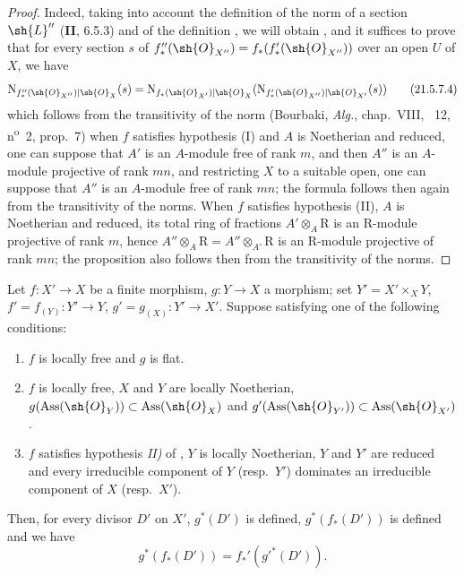 \begin{proof}
Indeed, taking into account the definition of the norm of a section $\sh{L}''$ (\textbf{II}, 6.5.3) and of the definition , we will obtain , and it suffices to prove that for every section $s$ of $f_*''(\sh{O}_{X''})=f_*(f_*'(\sh{O}_{X''}))$ over an open $U$ of $X$, we have
\[
\label{IV.21.5.7.4}
  \mathrm{N}_{f_*''(\sh{O}_{X''})|\sh{O}_X}(s)=\mathrm{N}_{f_*(\sh{O}_{X'})|\sh{O}_X}(\mathrm{N}_{f_*'(\sh{O}_{X''})|\sh{O}_{X'}}(s))
  \tag{21.5.7.4}
\]
which follows from the transitivity of the norm (Bourbaki, \emph{Alg.}, chap.~VIII, \textsection~12, n\textsuperscript{o}~2, prop.~7) when $f$ satisfies hypothesis (I) and $A$ is Noetherian and reduced, one can suppose that $A'$ is an $A$-module free of rank $m$, and then $A''$ is an $A$-module projective of rank $mn$, and restricting $X$ to a suitable open, one can suppose that $A''$ is an $A$-module free of rank $mn$;
the formula  follows then again from the transitivity of the norms.
When $f$ satisfies hypothesis (II), $A$ is Noetherian and reduced, its total ring of fractions $A'\otimes_A\mathrm{R}$ is an $\mathrm{R}$-module projective of rank $m$, hence $A''\otimes_A\mathrm{R}=A''\otimes_{A'}\mathrm{R}$ is an $\mathrm{R}$-module projective of rank $mn$;
the proposition also follows then from the transitivity of the norms.
\end{proof}

\begin{proposition}[21.5.8]
\label{IV.21.5.8}
Let $f:X'\to X$ be a finite morphism, $g:Y\to X$ a morphism;
set $Y'=X'\times_XY$, $f'=f_{(Y)}:Y'\to Y$, $g'=g_{(X)}:Y'\to X'$.
Suppose satisfying one of the following conditions:
\begin{enumerate}[label=(\roman*)]
  \item $f$ is locally free and $g$ is flat.
  \item $f$ is locally free, $X$ and $Y$ are locally Noetherian, $g(\operatorname{Ass}(\sh{O}_Y))\subset\operatorname{Ass}(\sh{O}_X)$ and $g'(\operatorname{Ass}(\sh{O}_{Y'}))\subset\operatorname{Ass}(\sh{O}_{X'})$.
  \item $f$ satisfies hypothesis \emph{II)} of , $Y$ is locally Noetherian, $Y$ and $Y'$ are reduced and every irreducible component of $Y$ (resp.\ $Y'$) dominates an irreducible component of $X$ (resp.\ $X'$).
\end{enumerate}
Then, for every divisor $D'$ on $X'$, $g^*(D')$ is defined, $g^*(f_*(D'))$ is defined and we have
\[
\label{IV.21.5.8.1}
  g^*(f_*(D'))=f_*'(g'^*(D')).
  \tag{21.5.8.1}
\]
\end{proposition}

